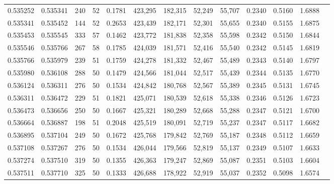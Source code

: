 \begin{tabular}{rrrrrrrrrrrrr}
0.535252 & 0.535341 &   240 &  52 &                                     0.1781 & 423,295 & 182,315 &  52,249 &  55,707 & 0.2340 & 0.5160 & 1.6888 \\
0.535341 & 0.535452 &   144 &  52 &                                     0.2653 & 423,439 & 182,171 &  52,301 &  55,655 & 0.2340 & 0.5155 & 1.6875 \\
0.535453 & 0.535545 &   333 &  57 &                                     0.1462 & 423,772 & 181,838 &  52,358 &  55,598 & 0.2342 & 0.5150 & 1.6844 \\
0.535546 & 0.535766 &   267 &  58 &                                     0.1785 & 424,039 & 181,571 &  52,416 &  55,540 & 0.2342 & 0.5145 & 1.6819 \\
0.535766 & 0.535979 &   239 &  51 &                                     0.1759 & 424,278 & 181,332 &  52,467 &  55,489 & 0.2343 & 0.5140 & 1.6797 \\
0.535980 & 0.536108 &   288 &  50 &                                     0.1479 & 424,566 & 181,044 &  52,517 &  55,439 & 0.2344 & 0.5135 & 1.6770 \\
0.536124 & 0.536311 &   276 &  50 &                                     0.1534 & 424,842 & 180,768 &  52,567 &  55,389 & 0.2345 & 0.5131 & 1.6745 \\
0.536311 & 0.536472 &   229 &  51 &                                     0.1821 & 425,071 & 180,539 &  52,618 &  55,338 & 0.2346 & 0.5126 & 1.6723 \\
0.536473 & 0.536656 &   250 &  50 &                                     0.1667 & 425,321 & 180,289 &  52,668 &  55,288 & 0.2347 & 0.5121 & 1.6700 \\
0.536664 & 0.536887 &   198 &  51 &                                     0.2048 & 425,519 & 180,091 &  52,719 &  55,237 & 0.2347 & 0.5117 & 1.6682 \\
0.536895 & 0.537104 &   249 &  50 &                                     0.1672 & 425,768 & 179,842 &  52,769 &  55,187 & 0.2348 & 0.5112 & 1.6659 \\
0.537108 & 0.537267 &   276 &  50 &                                     0.1534 & 426,044 & 179,566 &  52,819 &  55,137 & 0.2349 & 0.5107 & 1.6633 \\
0.537274 & 0.537510 &   319 &  50 &                                     0.1355 & 426,363 & 179,247 &  52,869 &  55,087 & 0.2351 & 0.5103 & 1.6604 \\
0.537511 & 0.537710 &   325 &  50 &                                     0.1333 & 426,688 & 178,922 &  52,919 &  55,037 & 0.2352 & 0.5098 & 1.6574 \\

\end{tabular}
